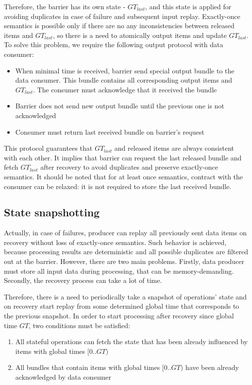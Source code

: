Therefore, the barrier has its own state - $GT_{last}$, and this state is applied for avoiding duplicates in case of failure and subsequent input replay. Exactly-once semantics is possible only if there are no any inconsistencies between released items and $GT_{last}$, so there is a need to atomically output items and update $GT_{last}$. To solve this problem, we require the following output protocol with data consumer:

\begin{itemize}
    \item When minimal time is received, barrier send special output bundle to the data consumer. This bundle contains all corresponding output items and $GT_{last}$. The consumer must acknowledge that it received the bundle
    \item Barrier does not send new output bundle until the previous one is not acknowledged
    \item Consumer must return last received bundle on barrier's request 
\end{itemize}

This protocol guarantees that $GT_{last}$ and released items are always consistent with each other. It implies that barrier can request the last released bundle and fetch $GT_{last}$ after recovery to avoid duplicates and preserve exactly-once semantics. It should be noted that for at least once semantics, contract with the consumer can be relaxed: it is not required to store the last received bundle.

\subsection{State snapshotting}
Actually, in case of failures, producer can replay all previously sent data items on recovery without loss of exactly-once semantics. Such behavior is achieved, because processing results are deterministic and all possible duplicates are filtered out at the barrier. However, there are two main problems. Firstly, data producer must store all input data during processing, that can be memory-demanding. Secondly, the recovery process can take a lot of time. 

Therefore, there is a need to periodically take a snapshot of operations' state and on recovery start replay from some determined global time that corresponds to the previous snapshot. In order to start processing after recovery since global time $GT$, two conditions must be satisfied:
\begin{enumerate}
    \item All stateful operations can fetch the state that has been already influenced by items with global times $[0..GT)$ 
    \item All bundles that contain items with global times $[0..GT)$ have been already acknowledged by data consumer 
\end{enumerate}

